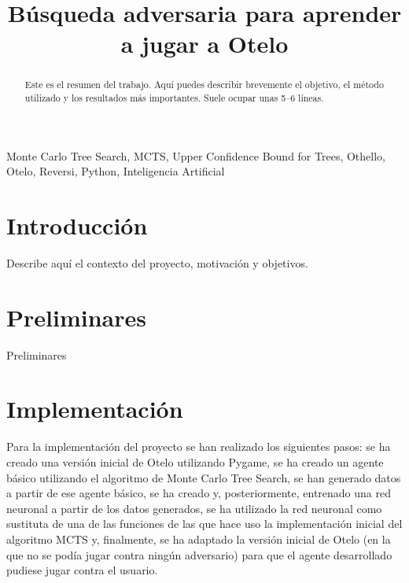 \documentclass[conference]{IEEEtran}
\begin{document}
\title{Búsqueda adversaria para aprender a jugar a Otelo}

\author{
    \and
}

\maketitle

\begin{abstract}
Este es el resumen del trabajo. Aquí puedes describir brevemente el objetivo, el método utilizado y los resultados más importantes. Suele ocupar unas 5–6 líneas.
\end{abstract}

\begin{IEEEkeywords}
Monte Carlo Tree Search, MCTS, Upper Confidence Bound for Trees, Othello, Otelo, Reversi, Python, Inteligencia Artificial
\end{IEEEkeywords}

\section{Introducción}
Describe aquí el contexto del proyecto, motivación y objetivos.

\section{Preliminares}
Preliminares

\section{Implementación}
Para la implementación del proyecto se han realizado los siguientes pasos: se ha creado una versión inicial de Otelo utilizando Pygame, se ha creado un agente básico utilizando el algoritmo de Monte Carlo Tree Search, se han generado datos a partir de ese agente básico, se ha creado y, posteriormente, entrenado una red neuronal a partir de los datos generados, se ha utilizado la red neuronal como sustituta de una de las funciones de las que hace uso la implementación inicial del algoritmo MCTS y, finalmente, se ha adaptado la versión inicial de Otelo (en la que no se podía jugar contra ningún adversario) para que el agente desarrollado pudiese jugar contra el usuario.
\end{document}
